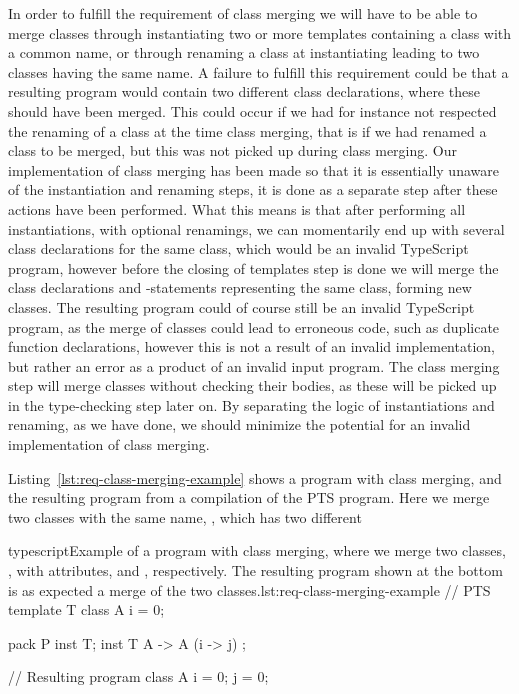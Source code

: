 In order to fulfill the requirement of class merging we will have to be able to merge classes through instantiating two or more templates containing a class with a common name, or through renaming a class at instantiating leading to two classes having the same name.
A failure to fulfill this requirement could be that a resulting program would contain two different class declarations, where these should have been merged.
This could occur if we had for instance not respected the renaming of a class at the time class merging, that is if we had renamed a class to be merged, but this was not picked up during class merging.
Our implementation of class merging has been made so that it is essentially unaware of the instantiation and renaming steps, it is done as a separate step after these actions have been performed.
What this means is that after performing all instantiations, with optional renamings, we can momentarily end up with several class declarations for the same class, which would be an invalid TypeScript program, however before the closing of templates step is done we will merge the class declarations and -statements representing the same class, forming new classes.
The resulting program could of course still be an invalid TypeScript program, as the merge of classes could lead to erroneous code, such as duplicate function declarations, however this is not a result of an invalid implementation, but rather an error as a product of an invalid input program.
The class merging step will merge classes without checking their bodies, as these will be picked up in the type-checking step later on.
By separating the logic of instantiations and renaming, as we have done, we should minimize the potential for an invalid implementation of class merging.

Listing~\vref{lst:req-class-merging-example} shows a program with class merging, and the resulting program from a compilation of the PTS program.
Here we merge two classes with the same name, , which has two different

\begin{code}{typescript}{Example of a program with class merging, where we merge two classes, , with attributes,  and , respectively. The resulting program shown at the bottom is as expected a merge of the two classes.}{lst:req-class-merging-example}
    // PTS
    template T {
        class A {
            i = 0;
        }
    }

    pack P {
        inst T;
        inst T { A -> A (i -> j) };
    }

    // Resulting program
    class A {
        i = 0;
        j = 0;
    }
\end{code}

